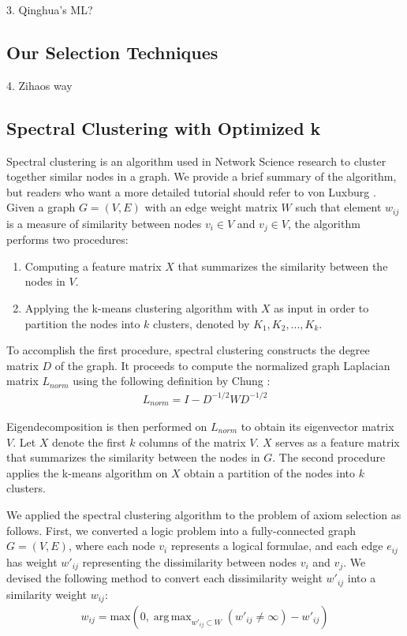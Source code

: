 \documentclass[EPiC]{easychair}
\DeclareMathOperator*{\argmaxA}{arg\,max} %
\begin{document}
3. Qinghua's ML?
\subsection{Our Selection Techniques}
\label{Zihao}

4. Zihaos way
\subsection{Spectral Clustering with Optimized k}
\label{Zishi}

Spectral clustering is an algorithm used in Network Science research to
cluster together similar nodes in a graph. We provide a brief summary of the
algorithm, but readers who want a more detailed tutorial should refer to
von Luxburg \cite{vonLuxburg2007}. 
Given a graph $G = (V, E)$ with an edge weight matrix $W$ such that element
$w_{ij}$ is a measure of similarity between nodes $v_{i} \in V$ and 
$v_{j} \in V$, the algorithm performs two procedures:
\begin{enumerate}
\item Computing a feature matrix $X$ that summarizes the similarity 
between the nodes in $V$.

\item Applying the k-means clustering algorithm with $X$ as input in order 
to partition the nodes into $k$ clusters, denoted by
$K_{1}, K_{2}, ..., K_{k}$.
\end{enumerate}

To accomplish the first procedure, spectral clustering constructs the 
degree matrix $D$ of the graph. It proceeds to compute the normalized 
graph Laplacian matrix $L_{norm}$ using the following definition by 
Chung \cite{Chung1997}:
\begin{align}
L_{norm} = I - D^{-1/2} W D^{-1/2}
\end{align}

Eigendecomposition is then performed on $L_{norm}$ to obtain its eigenvector
matrix $V$. Let $X$ denote the first $k$ columns of the matrix $V$. 
$X$ serves as a feature matrix that summarizes the similarity between the 
nodes in $G$. The second procedure applies the k-means algorithm on $X$
obtain a partition of the nodes into $k$ clusters.

We applied the spectral clustering algorithm to the problem of axiom 
selection as follows. First, we converted a logic problem into a 
fully-connected graph $G = (V, E)$, where each node $v_{i}$ represents a 
logical formulae, and each edge $e_{ij}$ has weight $w'_{ij}$ representing 
the dissimilarity between nodes $v_{i}$ and $v_{j}$. We devised the following 
method to convert each dissimilarity weight $w'_{ij}$ into a similarity 
weight $w_{ij}$:
\begin{align}
w_{ij} = \textrm{max}(0, 
	\argmaxA_{w'_{ij} \subset W} (w'_{ij} \neq \infty) - w'_{ij})
\end{align}
\end{document}
